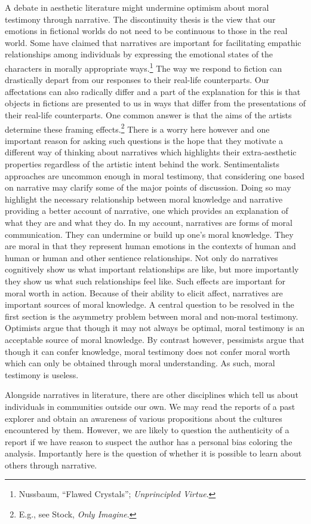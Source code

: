 \documentclass[
  12pt,
]{book}
\theoremstyle{definition}
\theoremstyle{definition}
\theoremstyle{definition}
\theoremstyle{definition}
\theoremstyle{remark}
\begin{document}
A debate in aesthetic literature might undermine optimism about moral testimony through narrative. The discontinuity thesis is the view that our emotions in fictional worlds do not need to be continuous to those in the real world. Some have claimed that narratives are important for facilitating empathic relationships among individuals by expressing the emotional states of the characters in morally appropriate ways.\footnote{Nussbaum, {``Flawed {Crystals}''}; \emph{Unprincipled {Virtue}}.} The way we respond to fiction can drastically depart from our responses to their real-life counterparts. Our affectations can also radically differ and a part of the explanation for this is that objects in fictions are presented to us in ways that differ from the presentations of their real-life counterparts. One common answer is that the aims of the artists determine these framing effects.\footnote{E.g., see Stock, \emph{Only Imagine}.} There is a worry here however and one important reason for asking such questions is the hope that they motivate a different way of thinking about narratives which highlights their extra-aesthetic properties regardless of the artistic intent behind the work. Sentimentalists approaches are uncommon enough in moral testimony, that considering one based on narrative may clarify some of the major points of discussion. Doing so may highlight the necessary relationship between moral knowledge and narrative providing a better account of narrative, one which provides an explanation of what they are and what they do. In my account, narratives are forms of moral communication. They can undermine or build up one's moral knowledge. They are moral in that they represent human emotions in the contexts of human and human or human and other sentience relationships. Not only do narratives cognitively show us what important relationships are like, but more importantly they show us what such relationships feel like. Such effects are important for moral worth in action. Because of their ability to elicit affect, narratives are important sources of moral knowledge. A central question to be resolved in the first section is the asymmetry problem between moral and non-moral testimony. Optimists argue that though it may not always be optimal, moral testimony is an acceptable source of moral knowledge. By contrast however, pessimists argue that though it can confer knowledge, moral testimony does not confer moral worth which can only be obtained through moral understanding. As such, moral testimony is useless.

Alongside narratives in literature, there are other disciplines which tell us about individuals in communities outside our own. We may read the reports of a past explorer and obtain an awareness of various propositions about the cultures encountered by them. However, we are likely to question the authenticity of a report if we have reason to suspect the author has a personal bias coloring the analysis. Importantly here is the question of whether it is possible to learn about others through narrative.
\end{document}
